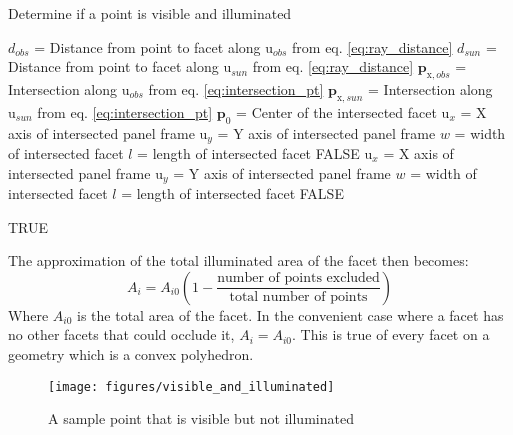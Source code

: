 \begin{algorithm}
	\caption{Determine if a point is visible and illuminated}
	\label{vis_and_illum}
	\begin{algorithmic}
		
			\STATE $d_{obs}$ = Distance from point to facet along $\bm{\mathrm{u}}_{obs}$ from eq. \ref{eq:ray_distance}
			\STATE $d_{sun}$ = Distance from point to facet along $\bm{\mathrm{u}}_{sun}$ from eq. \ref{eq:ray_distance}
			\STATE $\bm{p}_{\mathrm{x}, obs}$ = Intersection along $\bm{\mathrm{u}}_{obs}$ from eq. \ref{eq:intersection_pt} 
			\STATE $\bm{p}_{\mathrm{x}, sun}$ = Intersection along $\bm{\mathrm{u}}_{sun}$ from eq. \ref{eq:intersection_pt}
			\STATE $\bm{p}_0$ = Center of the intersected facet
			\STATE $\bm{\mathrm{u}}_{x}$ = X axis of intersected panel frame
			\STATE $\bm{\mathrm{u}}_{y}$ = Y axis of intersected panel frame
			\STATE $w$ = width of intersected facet
			\STATE $l$ = length of intersected facet
				\RETURN FALSE 
			\ENDIF
			\ENDIF
			\STATE $\bm{\mathrm{u}}_{x}$ = X axis of intersected panel frame
			\STATE $\bm{\mathrm{u}}_{y}$ = Y axis of intersected panel frame
			\STATE $w$ = width of intersected facet
			\STATE $l$ = length of intersected facet
				\RETURN FALSE 
			\ENDIF
			\ENDIF
			
		\ENDFOR
		\RETURN TRUE 

	\end{algorithmic}
\end{algorithm}

The approximation of the total illuminated area of the facet then becomes:
\begin{equation}
A_i = A_{i0} \left( 1 - \frac{\text{number of points excluded}}{\text{total number of points}} \right)
\end{equation}
Where $A_{i0}$ is the total area of the facet. In the convenient case where a facet has no other facets that could occlude it, $A_i = A_{i0}$. This is true of every facet on a geometry which is a convex polyhedron.
\begin{figure}[h!]
	\centering
	\texttt{[image: figures/visible\_and\_illuminated]}
	\caption{A sample point that is visible but not illuminated}
	\label{sample_pts}
\end{figure}
